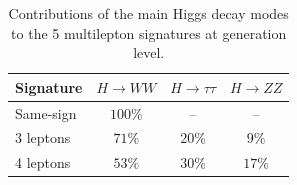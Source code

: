 \begin{table}[htbp]
  \begin{center} 
    \caption{Contributions of the main Higgs decay modes to the 5 multilepton
      \tth signatures at generation level.
      }\label{tab:summary} {\small
    \begin{tabular}{l|c|c|c} 
      \hline\hline
  Signature & $H \rightarrow WW$  & $H\rightarrow \tau\tau$  & $H \rightarrow
  ZZ$  \\\hline
  Same-sign &  $100\%$ & -- & -- \\
  3 leptons  &  $71\%$ & $20\%$ & $9\%$ \\
  4 leptons  &  $53\%$ & $30\%$ & $17\%$  \\
     \hline
    \end{tabular}}
  \end{center}
\end{table}






